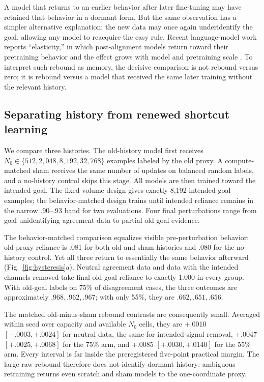 \documentclass[11pt,a4paper]{article}
\newcommand{\fig}[1]{Fig.~\ref{#1}}
\begin{document}
A model that returns to an earlier behavior after later fine-tuning may have retained that behavior in a dormant form. But the same observation has a simpler alternative explanation: the new data may once again underidentify the goal, allowing any model to reacquire the easy rule. Recent language-model work reports ``elasticity,'' in which post-alignment models return toward their pretraining behavior and the effect grows with model and pretraining scale \citep{ji2025alignment}. To interpret such rebound as memory, the decisive comparison is not rebound versus zero; it is rebound versus a model that received the same later training without the relevant history.

\subsection*{Separating history from renewed shortcut learning}

We compare three histories. The old-history model first receives $N_0\in\{512,2{,}048,8{,}192,32{,}768\}$ examples labeled by the old proxy. A compute-matched sham receives the same number of updates on balanced random labels, and a no-history control skips this stage. All models are then trained toward the intended goal. The fixed-volume design gives exactly 8,192 intended-goal examples; the behavior-matched design trains until intended reliance remains in the narrow .90--.93 band for two evaluations. Four final perturbations range from goal-unidentifying agreement data to partial old-goal evidence.

The behavior-matched comparison equalizes visible pre-perturbation behavior: old-proxy reliance is .081 for both old and sham histories and .080 for the no-history control. Yet all three return to essentially the same behavior afterward (\fig{fig:hysteresis}a). Neutral agreement data and data with the intended channels removed take final old-goal reliance to exactly 1.000 in every group. With old-goal labels on 75\% of disagreement cases, the three outcomes are approximately $.968,.962,.967$; with only 55\%, they are $.662,.651,.656$.

The matched old-minus-sham rebound contrasts are consequently small. Averaged within seed over capacity and available $N_0$ cells, they are +.0010 $[-.0003,+.0024]$ for neutral data, the same for intended-signal removal, +.0047 $[+.0025,+.0068]$ for the 75\% arm, and +.0085 $[+.0030,+.0140]$ for the 55\% arm. Every interval is far inside the preregistered five-point practical margin. The large raw rebound therefore does not identify dormant history: ambiguous retraining returns even scratch and sham models to the one-coordinate proxy.
\end{document}
